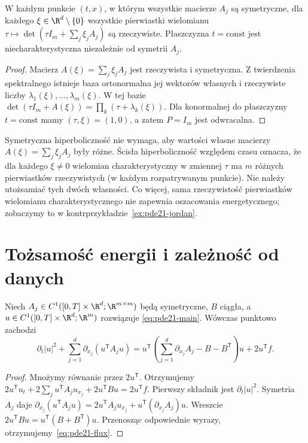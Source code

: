 \begin{stwierdzenie}
\label{prop:pde21-real}
W każdym punkcie $(t,x)$, w którym wszystkie macierze
$A_j$ są symetryczne, dla każdego
$\xi\in\R^d\setminus\{0\}$ wszystkie pierwiastki wielomianu
$\tau\mapsto\det(\tau I_m+\sum_j\xi_jA_j)$ są rzeczywiste.
Płaszczyzna $t=\mathrm{const}$ jest niecharakterystyczna
niezależnie od symetrii $A_j$.
\end{stwierdzenie}
\begin{proof}
Macierz $A(\xi)=\sum_j\xi_jA_j$ jest rzeczywista i symetryczna.
Z twierdzenia spektralnego istnieje baza ortonormalna jej wektorów
własnych i rzeczywiste liczby $\lambda_1(\xi),\ldots,\lambda_m(\xi)$.
W tej bazie $\det(\tau I_m+A(\xi))=\prod_k(\tau+\lambda_k(\xi))$.
Dla konormalnej do płaszczyzny $t=\mathrm{const}$ mamy $(\tau,\xi)=(1,0)$,
a zatem $P=I_m$ jest odwracalna.
\end{proof}

\begin{uwaga}
Symetryczna hiperboliczność nie wymaga, aby wartości
własne macierzy $A(\xi)=\sum_j\xi_jA_j$ były różne.
Ścisła hiperboliczność względem czasu oznacza, że
dla każdego $\xi\ne0$ wielomian charakterystyczny
w zmiennej $\tau$ ma $m$ różnych pierwiastków
rzeczywistych (w każdym rozpatrywanym punkcie).
Nie należy utożsamiać tych dwóch własności. Co więcej,
sama rzeczywistość pierwiastków wielomianu charakterystycznego nie
zapewnia oszacowania energetycznego; zobaczymy to w
kontrprzykładzie~\ref{ex:pde21-jordan}.
\end{uwaga}

\section{Tożsamość energii i zależność od danych}
\begin{lemat}\label{lem:pde21-local}
Niech $A_j\in C^1([0,T]\times\R^d;\R^{m\times m})$ będą symetryczne,
$B$ ciągła, a $u\in C^1([0,T]\times\R^d;\R^m)$ rozwiązuje
\eqref{eq:pde21-main}. Wówczas punktowo zachodzi
\begin{equation}\label{eq:pde21-flux}
 \partial_t|u|^2+\sum_{j=1}^d\partial_{x_j}(u^\mathsf TA_ju)
 =u^\mathsf T\!\left(\sum_{j=1}^d\partial_{x_j}A_j-B-B^\mathsf T\right)u
 +2u^\mathsf Tf.
\end{equation}
\end{lemat}
\begin{proof}
Mnożymy równanie przez $2u^\mathsf T$. Otrzymujemy
$2u^\mathsf Tu_t+2\sum_j u^\mathsf TA_ju_{x_j}+2u^\mathsf TBu=2u^\mathsf Tf$.
Pierwszy składnik jest $\partial_t|u|^2$. Symetria $A_j$ daje
$\partial_{x_j}(u^\mathsf TA_ju)=2u^\mathsf TA_ju_{x_j}
+u^\mathsf T(\partial_{x_j}A_j)u$.
Wreszcie $2u^\mathsf TBu=u^\mathsf T(B+B^\mathsf T)u$.
Przenosząc odpowiednie wyrazy, otrzymujemy~\eqref{eq:pde21-flux}.
\end{proof}

